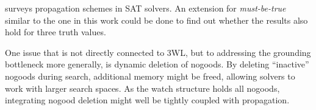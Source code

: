 \documentclass[final]{vutinfth} %
\newcommand{\mbt}{must-be-true\xspace}
\begin{document}
\cite{effstructs} surveys propagation schemes in SAT solvers. An extension for \emph{\mbt} similar to the one in this work could be done to find out whether the results also hold for three truth values.

One issue that is not directly connected to 3WL, but to addressing the grounding bottleneck more generally, is dynamic deletion of nogoods. By deleting \enquote{inactive} nogoods during search, additional memory might be freed, allowing solvers to work with larger search spaces. As the watch structure holds all nogoods, integrating nogood deletion might well be tightly coupled with propagation.

\backmatter
\listoffigures*
\listoftables*
\listofalgorithms


\begingroup
\renewcommand{\addcontentsline}[3]{}%

\endgroup
\end{document}
